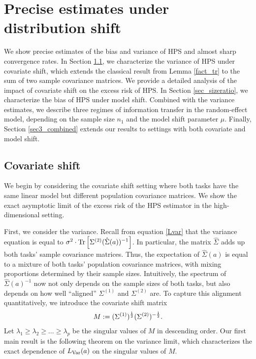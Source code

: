 \section{Precise estimates under distribution shift}\label{sec_main}

We show precise estimates of the bias and variance of HPS and almost sharp convergence rates.
In Section \ref{sec3_cov}, we characterize the variance of HPS under covariate shift, which extends the classical result from Lemma \ref{fact_tr} to the sum of two sample covariance matrices.
We provide a detailed analysis of the impact of covariate shift on the excess risk of HPS.
In Section \ref{sec_sizeratio}, we characterize the bias of HPS under model shift.
Combined with the variance estimates, we describe three regimes of information transfer in the random-effect model, depending on the sample size $n_1$ and the model shift parameter $\mu$.
Finally, Section \ref{sec3_combined} extends our results to settings with both covariate and model shift.


\subsection{Covariate shift}\label{sec3_cov}

We begin by considering the covariate shift setting where both tasks have the same linear model but different population covariance matrices.
We show the exact asymptotic limit of the excess risk of the HPS estimator in the high-dimensional setting.

First, we consider the variance. Recall from equation \eqref{Lvar} that the variance equation is equal to $\sigma^2 \cdot \operatorname{Tr}\left[\Sigma^{(2)} (\hat\Sigma(a))^{-1}\right]$.
In particular, the matrix $\hat{\Sigma}$ adds up both tasks' sample covariance matrices.
Thus, the expectation of $\hat{\Sigma}(a)$ is equal to a mixture of both tasks' population covariance matrices, with mixing proportions determined by their sample sizes.
Intuitively, the spectrum of $\hat{\Sigma}(a)^{-1}$ now not only depends on the sample sizes of both tasks, but also depends on how well ``aligned'' $\Sigma^{(1)}$ and $\Sigma^{(2)}$ are.
To capture this alignment quantitatively, we introduce the covariate shift matrix %
$$ M := (\Sigma^{(1)})^{\frac 1 2}(\Sigma^{(2)})^{-\frac 1 2}.$$
Let $\lambda_1 \ge \lambda_2 \ge \dots\ge \lambda_p $ be the singular values of $M$ in descending order.
Our first main result is the following theorem on the variance limit, which characterizes the exact dependence of $L_{\operatorname{Var}}(a)$ on the singular values of $M$.


